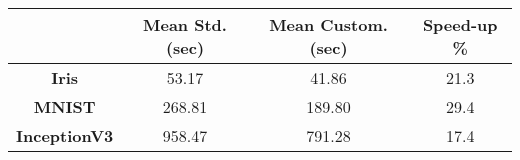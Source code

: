 \scriptsize

\begin{tabular}{|c|c|c|c|} 
\hline
 & \textbf{Mean Std. (sec)} & \textbf{Mean Custom. (sec)} & \textbf{Speed-up \%}\\
\hline
\textbf{Iris} & 53.17 & 41.86 &  21.3\\
\hline
\textbf{MNIST} & 268.81 & 189.80 & 29.4 \\
\hline
\textbf{InceptionV3} & 958.47 & 791.28 & 17.4 \\
\hline
\end{tabular}
